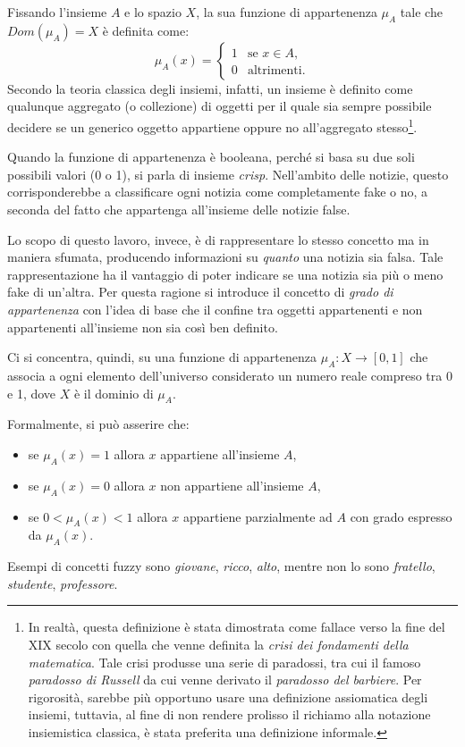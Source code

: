 \documentclass[12pt]{report}
\theoremstyle{definition}
\begin{document}
Fissando l'insieme $A$ e lo spazio $X$, la sua funzione di appartenenza $\mu_A$ tale che $Dom(\mu_A) = X$ è definita come:
\begin{equation}
    \mu_A(x)= \begin{cases} 1 & \mbox{se } x \in A, \\ 0 & \mbox{altrimenti.} \end{cases}
\end{equation}
Secondo la teoria classica degli insiemi, infatti, un insieme è definito come qualunque aggregato (o collezione) di oggetti per il quale sia sempre possibile decidere se un generico oggetto appartiene oppure no all'aggregato stesso\footnote{In realtà, questa definizione è stata dimostrata come fallace verso la fine del XIX secolo con quella che venne definita la \textit{crisi dei fondamenti della matematica}. Tale crisi produsse una serie di paradossi, tra cui il famoso \textit{paradosso di Russell} da cui venne derivato il \textit{paradosso del barbiere}. Per rigorosità, sarebbe più opportuno usare una definizione assiomatica degli insiemi, tuttavia, al fine di non rendere prolisso il richiamo alla notazione insiemistica classica, è stata preferita una definizione informale.}.

Quando la funzione di appartenenza è booleana, perché si basa su due soli possibili valori (0 o 1), si parla di insieme \textit{crisp}. Nell'ambito delle notizie, questo corrisponderebbe a classificare ogni notizia come completamente fake o no, a seconda del fatto che appartenga all'insieme delle notizie false.

Lo scopo di questo lavoro, invece, è di rappresentare lo stesso concetto ma in maniera sfumata, producendo informazioni su \textit{quanto} una notizia sia falsa.
Tale rappresentazione ha il vantaggio di poter indicare se una notizia sia più o meno fake di un'altra.
Per questa ragione si introduce il concetto di \textit{grado di appartenenza} con l'idea di base che il confine tra oggetti appartenenti e non appartenenti all'insieme non sia così ben definito.

Ci si concentra, quindi, su una funzione di appartenenza $\mu_A: X \rightarrow [0,1]$ che associa a ogni elemento dell'universo considerato un numero reale compreso tra 0 e 1, dove $X$ è il dominio di $\mu_A$.

Formalmente, si può asserire che:
\begin{itemize}
    \item se $\mu_A(x) = 1$ allora $x$ appartiene all'insieme $A$,
    \item se $\mu_A(x) = 0$ allora $x$ non appartiene all'insieme $A$,
    \item se $0 < \mu_A(x) < 1$ allora $x$ appartiene parzialmente ad $A$ con grado espresso da $\mu_A(x)$.
\end{itemize}
Esempi di concetti fuzzy sono \textit{giovane}, \textit{ricco}, \textit{alto}, mentre non lo sono \textit{fratello}, \textit{studente}, \textit{professore}.
\end{document}
